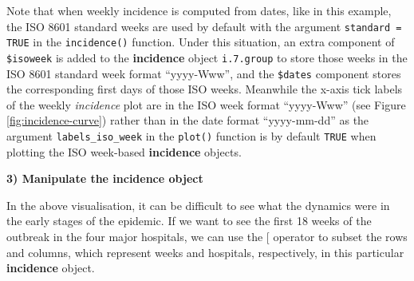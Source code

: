 \documentclass[9pt,a4paper]{extarticle}
\newenvironment{Shaded}{\begin{snugshade}}{\end{snugshade}}
\newcommand{\CommentTok}[1]{\textcolor[rgb]{0.56,0.35,0.01}{\textit{#1}}}
\newcommand{\DataTypeTok}[1]{\textcolor[rgb]{0.13,0.29,0.53}{#1}}
\newcommand{\DecValTok}[1]{\textcolor[rgb]{0.00,0.00,0.81}{#1}}
\newcommand{\FloatTok}[1]{\textcolor[rgb]{0.00,0.00,0.81}{#1}}
\newcommand{\KeywordTok}[1]{\textcolor[rgb]{0.13,0.29,0.53}{\textbf{#1}}}
\newcommand{\NormalTok}[1]{#1}
\newcommand{\OperatorTok}[1]{\textcolor[rgb]{0.81,0.36,0.00}{\textbf{#1}}}
\newcommand{\OtherTok}[1]{\textcolor[rgb]{0.56,0.35,0.01}{#1}}
\newcommand{\StringTok}[1]{\textcolor[rgb]{0.31,0.60,0.02}{#1}}
\begin{document}
Note that when weekly incidence is computed from dates, like in this example, the ISO 8601 standard weeks are used by default with the argument \texttt{standard = TRUE} in the \texttt{incidence()} function.
Under this situation, an extra component of \texttt{\$isoweek} is added to the \textbf{incidence} object \texttt{i.7.group} to store those weeks in the ISO 8601 standard week format ``yyyy-Www'', and the \texttt{\$dates} component stores the corresponding first days of those ISO weeks.
Meanwhile the x-axis tick labels of the weekly \emph{incidence} plot are in the ISO week format ``yyyy-Www'' (see Figure \ref{fig:incidence-curve}) rather than in the date format ``yyyy-mm-dd'' as the argument \texttt{labels\_iso\_week} in the \texttt{plot()} function is by default \texttt{TRUE} when plotting the ISO week-based \textbf{incidence} objects.

\textbf{3) Manipulate the incidence object}

In the above visualisation, it can be difficult to see what the dynamics were in the early stages of the epidemic.
If we want to see the first 18 weeks of the outbreak in the four major hospitals, we can use the {[} operator to subset the rows and columns, which represent weeks and hospitals, respectively, in this particular \textbf{incidence} object.

\begin{Shaded}
\end{Shaded}
\end{document}
